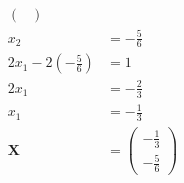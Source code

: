 \documentclass{article}
\begin{document}
\begin{align*}
\begin{pmatrix}
                                          \end{pmatrix}    \\
  x_2                                   & = -\frac{5}{6}    \\
  2 x_1 - 2 \left( -\frac{5}{6} \right) & = 1               \\
  2 x_1                                 & = -\frac{2}{3}    \\
  x_1                                   & = -\frac{1}{3}    \\
  \mathbf{X}                            & = \begin{pmatrix}
                                              -\frac{1}{3} \\
                                              -\frac{5}{6}
                                            \end{pmatrix}
\end{align*}

\setcounter{subsubsection}{22}
\subsubsection{}
\end{document}
